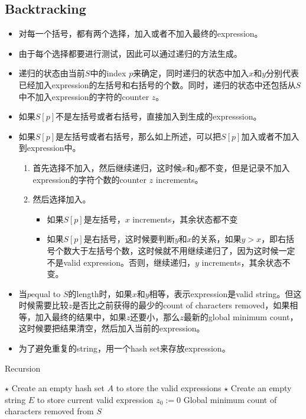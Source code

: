 \subsection{Backtracking}
\begin{itemize}
	\item 对每一个括号，都有两个选择，加入或者不加入最终的expression。
	\item 由于每个选择都要进行测试，因此可以通过递归的方法生成。
	\item 递归的状态由当前$S$中的index $p$来确定，同时递归的状态中加入$x$和$y$分别代表已经加入expression的左括号和右括号的个数。同时，递归的状态中还包括从$S$中不加入expression的字符的counter $z$。
	\item 如果$S[p]$不是左括号或者右括号，直接加入到生成的expresssion。
	\item 如果$S[p]$是左括号或者右括号，那么如上所述，可以把$S[p]$加入或者不加入到expression中。
	\begin{enumerate}
		\item 首先选择不加入，然后继续递归，这时候$x$和$y$都不变，但是记录不加入expression的字符个数的counter $z$ increments。
		\item 然后选择加入。
		\begin{itemize}
			\item 如果$S[p]$是左括号，$x$ increments，其余状态都不变
			\item 如果$S[p]$是右括号，这时候要判断$y$和$x$的关系，如果$y>x$，即右括号个数大于左括号个数，这时候就不用继续递归了，因为这时候一定不是valid expression。否则，继续递归，$y$ increments，其余状态不变。
		\end{itemize}
	\end{enumerate}
\item 当$p$equal to $S$的length时，如果$x$和$y$相等，表示expression是valid string。但这时候需要比较$z$是否比之前获得的最少的count of characters removed，如果相等，加入最终的结果中，如果$z$还要小，那么$z$最新的global minimum count，这时候要把结果清空，然后加入当前的expression。
\item 为了避免重复的string，用一个hash set来存放expression。
\end{itemize}
\begin{algorithm}[H]
	\caption{Recursion}
	\begin{algorithmic}[1]
		\State $\star$ Create an empty hash set $A$ to store the valid expressions
		\State $\star$ Create an empty string $E$ to store current valid expression
		\State $z_0:=0$ \Comment Global minimum count of characters removed from $S$
		\State {}
		\EndProcedure
	\end{algorithmic}
\end{algorithm}
